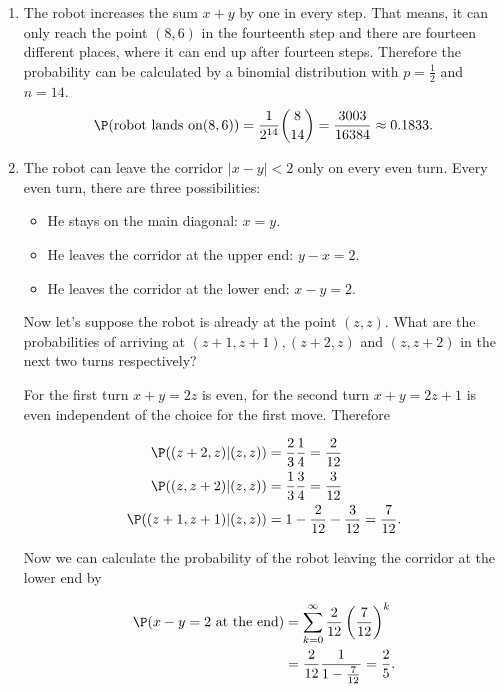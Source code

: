 \begin{solution}

\phantom{}

\begin{enumerate}[label = (\alph*)]
  \item The robot increases the sum $x + y$ by one in every step. That means, it can only
  reach the point $(8,6)$ in the fourteenth step and there are fourteen different places,
  where it can end up after fourteen steps.
  Therefore the probability can be calculated by a binomial distribution
  with $p = \frac{1}{2}$ and $n = 14$.
  \begin{align*}
    \P(\text{robot lands on} (8,6)) = \frac{1}{2^{14}}\binom{8}{14} = \frac{3003}{16384} \approx 0.1833.
  \end{align*}
  \item The robot can leave the corridor $|x - y| < 2$ only on every even turn.
  Every even turn, there are three possibilities:
  \begin{itemize}
    \item He stays on the main diagonal: $x = y$.
    \item He leaves the corridor at the upper end: $y - x = 2$.
    \item He leaves the corridor at the lower end: $x - y = 2$.
  \end{itemize}

  Now let's suppose the robot is already at the point $(z,z)$.
  What are the probabilities of arriving at $(z+1,z+1), (z+2,z)$ and $(z,z+2)$
  in the next two turns respectively?

  For the first turn $x+y = 2z$ is even, for the second turn $x+y=2z+1$ is even
  independent of the choice for the first move. Therefore

  \begin{align*}
    \P((z+2,z)|(z,z)) &= \frac{2}{3}\frac{1}{4} = \frac{2}{12} \\
    \P((z,z + 2)|(z,z)) &= \frac{1}{3}\frac{3}{4} = \frac{3}{12} \\
    \P((z+1,z+1)|(z,z)) &= 1 - \frac{2}{12} - \frac{3}{12} = \frac{7}{12}.
  \end{align*}

  Now we can calculate the probability of the robot leaving the corridor at the lower
  end by

  \begin{align*}
    \P(x-y=2 \text{ at the end}) &= \sum_{k=0}^\infty \frac{2}{12}\left(\frac{7}{12}\right)^k \\
    &= \frac{2}{12}\frac{1}{1 - \frac{7}{12}} = \frac{2}{5}.
  \end{align*}

\end{enumerate}



\end{solution}

